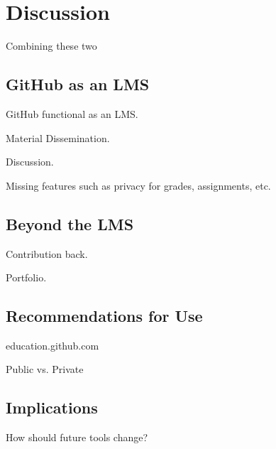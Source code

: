 \chapter{Discussion}
Combining these two 

\section{GitHub as an LMS}
GitHub functional as an LMS.

Material Dissemination.

Discussion.

Missing features such as privacy for grades, assignments, etc.

\section{Beyond the LMS}
Contribution back.

Portfolio.

\section{Recommendations for Use}
education.github.com

Public vs. Private

\section{Implications}

How should future tools change?


